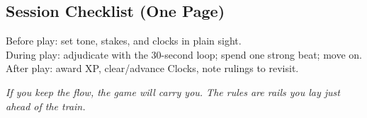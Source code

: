 \subsection{Session Checklist (One Page)}
Before play: set tone, stakes, and clocks in plain sight.\\
During play: adjudicate with the 30-second loop; spend one strong beat; move on.\\
After play: award XP, clear/advance Clocks, note rulings to revisit.

\bigskip
\noindent\textit{If you keep the flow, the game will carry you. The rules are rails you lay just ahead of the train.}
